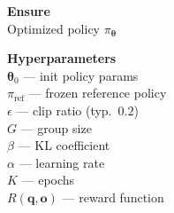 \documentclass[11pt]{article}
\begin{document}

\begin{algorithm}[p]\small
\caption{GRPO (Group Relative Policy Optimization)}\label{alg:grpo}
\vspace{2pt}
\noindent
\begin{minipage}[t]{0.28\linewidth}
\renewcommand{\arraystretch}{1.12}
\textbf{Ensure} \\[2pt]
Optimized policy $\pi_{\boldsymbol{\theta}}$

\vspace{6pt}
\textbf{Hyperparameters} \\[2pt]
$\boldsymbol{\theta}_0$ --- init policy params \\
$\pi_{\text{ref}}$ --- frozen reference policy \\
$\epsilon$ --- clip ratio (typ.\ $0.2$) \\
$G$ --- group size \\
$\beta$ --- KL coefficient \\
$\alpha$ --- learning rate \\
$K$ --- epochs \\
$R(\mathbf{q}, \mathbf{o})$ --- reward function


\end{minipage}
\end{algorithm}
\end{document}
